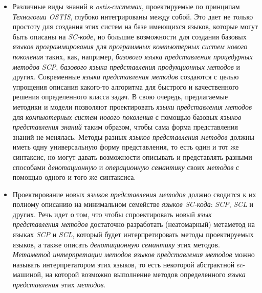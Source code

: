 \begin{SCn}
\begin{scnsubstruct}
\begin{scnsubstruct}
{\begin{itemize}
            \item Различные виды знаний в \textit{ostis-системах}, проектируемые по принципам \textit{Технологии OSTIS}, глубоко интегрированы между собой. Это дает не только простоту для создания этих систем на базе имеющихся языков, которые могут быть описаны на \textit{SC-коде}, но большие возможности для создания базовых \textit{языков программирования} для \textit{программных компьютерных систем нового поколения} таких, как, например, \textit{базового языка представления процедурных методов SCP}, \textit{базового языка представления продукционных методов} и других. Современные \textit{языки представления методов} создаются с целью упрощения описания какого-то алгоритма для быстрого и качественного решения определенного класса задач. В свою очередь, предлагаемые методики и модели позволяют проектировать \textit{языки представления методов} для \textit{компьютерных систем нового поколения} с помощью базовых \textit{языков представления знаний} таким образом, чтобы сама форма представления знаний не менялась. Методы разных \textit{языков представления методов} должны иметь одну универсальную форму представления, то есть один и тот же синтаксис, но могут давать возможности описывать и представлять разными способами \textit{денотационную} и \textit{операционную семантику} своих \textit{методов} с помощью одного и того же синтаксиса.
            \item Проектирование новых \textit{языков представления методов} должно сводится к их полному описанию на минимальном семействе \textit{языков SC-кода}: \textit{SCP}, \textit{SCL} и других. Речь идет о том, что чтобы спроектировать новый \textit{язык представления методов} достаточно разработать (неатомарный) метаметод на языках \textit{SCP} и \textit{SCL}, который будет интерпретировать методы проектируемых языков, а также описать \textit{денотационную семантику} этих методов. \textit{Метаметод интерпретации методов языков представления методов} можно называть интерпретатором этих языков, то есть некоторой абстрактной sc-машиной, на которой возможно выполнение методов определенного \textit{языка представления} этих \textit{методов}.
        \end{itemize}}
\end{scnsubstruct}

\begin{scnsubstruct}
	

\end{scnsubstruct}
\end{scnsubstruct}
\end{SCn}
